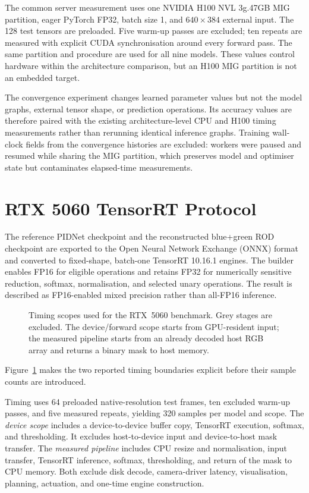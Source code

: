 The common server measurement uses one NVIDIA H100 NVL 3g.47GB MIG partition,
eager PyTorch FP32, batch size 1, and $640\times384$ external input. The 128
test tensors are preloaded. Five warm-up passes are excluded; ten repeats are
measured with explicit CUDA synchronisation around every forward pass. The
same partition and procedure are used for all nine models. These values
control hardware within the architecture comparison, but an H100 MIG
partition is not an embedded target.

The convergence experiment changes learned parameter values but not the model
graphs, external tensor shape, or prediction operations. Its accuracy values
are therefore paired with the existing architecture-level CPU and H100 timing
measurements rather than rerunning identical inference graphs. Training
wall-clock fields from the convergence histories are excluded: workers were
paused and resumed while sharing the MIG partition, which preserves model and
optimiser state but contaminates elapsed-time measurements.

\section{RTX 5060 TensorRT Protocol}

The reference PIDNet checkpoint and the reconstructed blue+green ROD checkpoint
are exported to the Open Neural Network Exchange (ONNX) format and converted
to fixed-shape, batch-one TensorRT 10.16.1 engines. The builder enables FP16
for eligible operations and retains FP32 for numerically sensitive reduction,
softmax, normalisation, and selected unary operations. The result is described
as FP16-enabled mixed precision rather than all-FP16 inference.

\begin{figure}[H]
\centering
\resizebox{\textwidth}{!}{}
\caption[Timing scopes used for the RTX 5060 benchmark.]{Timing scopes used for
the RTX~5060 benchmark. Grey stages are excluded. The device/forward scope
starts from GPU-resident input; the measured pipeline starts from an already
decoded host RGB array and returns a binary mask to host memory.}
\label{fig:timing_scopes}
\end{figure}

Figure~\ref{fig:timing_scopes} makes the two reported timing boundaries
explicit before their sample counts are introduced.

Timing uses 64 preloaded native-resolution test frames, ten excluded warm-up
passes, and five measured repeats, yielding 320 samples per model and scope.
The \emph{device scope} includes a device-to-device buffer copy, TensorRT
execution, softmax, and thresholding. It excludes host-to-device input and
device-to-host mask transfer. The \emph{measured pipeline} includes CPU resize
and normalisation, input transfer, TensorRT inference, softmax, thresholding,
and return of the mask to CPU memory. Both exclude disk decode, camera-driver
latency, visualisation, planning, actuation, and one-time engine construction.

